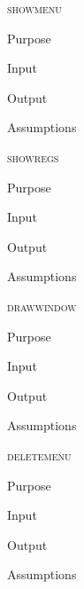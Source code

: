 \documentclass[pdftex, 11pt]{article}
\begin{document}
\begin{description}

	\item{\textsc{showmenu}}

		\begin{description}
			\item{Purpose}


			\item{Input}


			\item{Output}


			\item{Assumptions}


		\end{description}


	\item{\textsc{showregs}}

		\begin{description}
			\item{Purpose}


			\item{Input}


			\item{Output}


			\item{Assumptions}


		\end{description}


	\item{\textsc{drawwindow}}

		\begin{description}
			\item{Purpose}


			\item{Input}


			\item{Output}


			\item{Assumptions}


		\end{description}


	\item{\textsc{deletemenu}}

		\begin{description}
			\item{Purpose}


			\item{Input}


			\item{Output}


			\item{Assumptions}



\end{description}
\end{description}
\end{document}
